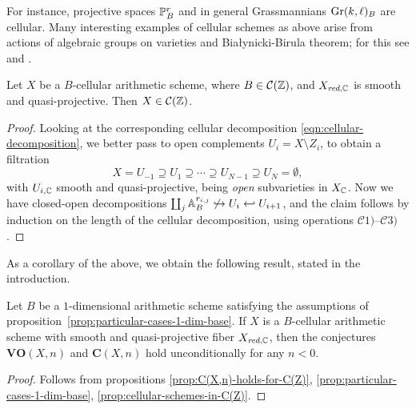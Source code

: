 \documentclass{article}
\numberwithin{equation}{section}
\begin{document}
For instance, projective spaces $\PP^r_B$ and in general Grassmannians
$\Gr (k,\ell)_B$ are cellular. Many interesting examples of cellular schemes as
above arise from actions of algebraic groups on varieties and Białynicki-Birula
theorem; for this see \cite{Wendt-2010} and \cite{Brosnan-2005}.

\begin{proposition}
  \label{prop:cellular-schemes-in-C(Z)}
  Let $X$ be a $B$-cellular arithmetic scheme, where $B \in \mathcal{C} (\ZZ)$,
  and $X_{\red,\CC}$ is smooth and quasi-projective. Then
  $X \in \mathcal{C} (\ZZ)$.

  \begin{proof}
    Looking at the corresponding cellular decomposition
    \eqref{eqn:cellular-decomposition}, we better pass to open complements
    $U_i = X\setminus Z_i$, to obtain a filtration
    $$X = U_{-1} \supseteq U_1 \supseteq \cdots \supseteq U_{N-1} \supseteq U_N = \emptyset,$$
    with $U_{i,\CC}$ smooth and quasi-projective, being \emph{open}
    subvarieties in $X_\CC$. Now we have closed-open decompositions
    $\coprod_j \AA^{r_{i,j}}_B \not\hookrightarrow U_i \hookleftarrow U_{i+1}$,    
    and the claim follows by induction on the length of the cellular
    decomposition, using operations
    $\mathcal{C}1)$--$\mathcal{C}3)$.
  \end{proof}
\end{proposition}

As a corollary of the above, we obtain the following result, stated in the
introduction.

\begin{theorem}
  Let $B$ be a $1$-dimensional arithmetic scheme satisfying the assumptions of
  proposition~\ref{prop:particular-cases-1-dim-base}. If $X$ is a $B$-cellular
  arithmetic scheme with smooth and quasi-projective fiber $X_{\red,\CC}$, then
  the conjectures $\mathbf{VO} (X,n)$ and $\mathbf{C} (X,n)$ hold
  unconditionally for any $n < 0$.

  \begin{proof}
    Follows from propositions
    \ref{prop:C(X,n)-holds-for-C(Z)},
    \ref{prop:particular-cases-1-dim-base},
    \ref{prop:cellular-schemes-in-C(Z)}.
  \end{proof}
\end{theorem}


\pagebreak
\end{document}
